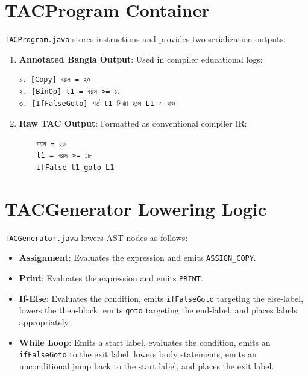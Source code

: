 \documentclass[12pt, a4paper]{report}
\begin{document}
\section{TACProgram Container}
\texttt{TACProgram.java} stores instructions and provides two serialization outputs:
\begin{enumerate}
    \item \textbf{Annotated Bangla Output}: Used in compiler educational logs:
\begin{lstlisting}
১. [Copy] বয়স = ২০
২. [BinOp] t1 = বয়স >= ১৮
৩. [IfFalseGoto] শর্ত t1 মিথ্যা হলে L1-এ যাও
\end{lstlisting}
    \item \textbf{Raw TAC Output}: Formatted as conventional compiler IR:
\begin{lstlisting}
    বয়স = ২০
    t1 = বয়স >= ১৮
    ifFalse t1 goto L1
\end{lstlisting}
\end{enumerate}

\section{TACGenerator Lowering Logic}
\texttt{TACGenerator.java} lowers AST nodes as follows:
\begin{itemize}
    \item \textbf{Assignment}: Evaluates the expression and emits \texttt{ASSIGN\_COPY}.
    \item \textbf{Print}: Evaluates the expression and emits \texttt{PRINT}.
    \item \textbf{If-Else}: Evaluates the condition, emits \texttt{ifFalseGoto} targeting the else-label, lowers the then-block, emits \texttt{goto} targeting the end-label, and places labels appropriately.
    \item \textbf{While Loop}: Emits a start label, evaluates the condition, emits an \texttt{ifFalseGoto} to the exit label, lowers body statements, emits an unconditional jump back to the start label, and places the exit label.
\end{itemize}
\end{document}
